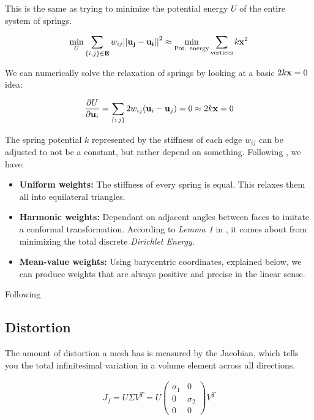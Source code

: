 \spa

This is the same as trying to minimize the potential energy $U$
of the entire system of springs.

\begin{align*}
\min_{U} \sum_{\{i,j\} \in \bf{E}} w_{ij}\bf{||u_j-u_i||}^2
\approx \min_{\text{Pot. energy}} \sum_{\text{vertices}} k\bf{x}^2
\end{align*}

We can numerically solve the relaxation of springs by looking at a basic
$2k\bf{x}=0$ idea:

\begin{align*}
\frac{\partial U}{\partial\bf{u}_i}=\sum_{\{i\,j\}} 2w_{ij} 
(\bf{u}_i-\bf{u}_j)=0 \approx 2k\bf{x}=0
\end{align*}

The spring potential $k$ represented by the stiffness of each edge
$w_{ij}$ can be adjusted to not be a constant, but rather depend on
something. Following \cite{param1stanford}, we have:

\begin{itemize}
    \item \textbf{Uniform weights:} The stiffness of every spring
    is equal. This relaxes them all into equilateral triangles.

    \item \textbf{Harmonic weights:} Dependant on adjacent angles
    between faces to imitate a conformal transformation. According
    to \emph{Lemma 1} in \cite{minimal1}, it comes about from
    minimizing the total discrete \emph{Dirichlet Energy}.

    \item \textbf{Mean-value weights:} Using barycentric coordinates,
    explained below, we can produce weights that are always positive
    and precise in the linear sense.
\end{itemize}

Following \cite{param2sheffer}

\spa

\subsection{Distortion}

The amount of distortion a mesh has is measured by the Jacobian, which
tells you the total infinitesimal variation in a volume element across
all directions.

\begin{align*}
    J_f = U\Sigma V^T = U
\begin{pmatrix}
\sigma_1 & 0\\
 0 & \sigma_2\\
 0 & 0
\end{pmatrix}
V^T
\end{align*}


